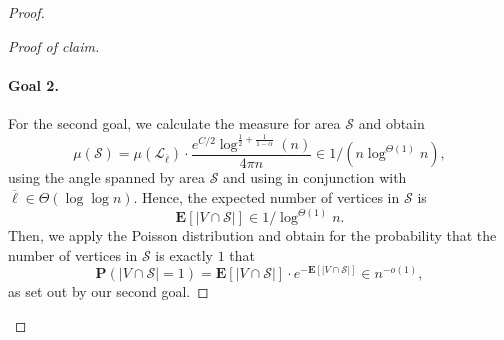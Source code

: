 \documentclass[letterpaper,11pt]{article}
\newcommand{\E}[1]{\mathbf{E}\left[#1\right]}
\newcommand{\Prob}[1]{\mathbf{P}\left(#1\right)}
\newcommand{\1}{\mathbb I}
\newcommand{\Layer}[1]{\mathcal{L}_{#1}}
\begin{document}
\begin{proof}
{\begin{proof}[Proof of claim]
\paragraph{Goal 2.} For the second goal, we calculate the measure for area $\mathcal{S}$ and obtain
%
$$
\mu(\mathcal{S}) = \mu(\mathcal{\Layer{\overline{\ell}}})\cdot \frac{e^{C/2}\log^{\frac{1}{2} + \frac{1}{1-\alpha}}(n)}{4\pi n} \in 1/(n\log^{\Theta(1)} n),
$$ 
%
using the angle spanned by area $\mathcal{S}$ and using  in conjunction with $\overline{\ell}  \in \Theta(\log\log n)$. Hence, the expected number of vertices in $\mathcal{S}$ is 
$$
\E{|V \cap \mathcal{S}|} \in 1/\log^{\Theta(1)} n.
$$
Then, we apply the Poisson distribution and obtain for the probability that the number of vertices in $\mathcal{S}$ is exactly $1$ that 
$$
\Prob{|V \cap \mathcal{S}| = 1} = \E{|V \cap \mathcal{S}|} \cdot e^{-\E{|V \cap \mathcal{S}|}} \in n^{-o(1)},
$$
as set out by our second goal.


\end{proof}}
\end{proof}
\end{document}
